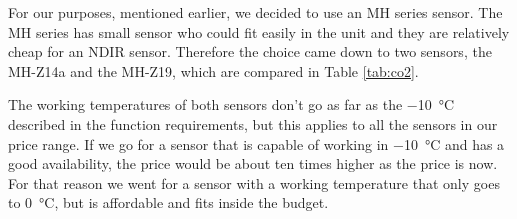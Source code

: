\documentclass[a4paper,oneside]{book}
\begin{document}
For our purposes, mentioned earlier,  we decided to use an MH series 
sensor. The MH series has small sensor who could fit easily in the unit and
they are relatively cheap for an NDIR  sensor. Therefore the choice
came down to two sensors, the MH-Z14a and the MH-Z19, which are compared in
Table \ref{tab:co2}.

\begin{table}[!htb]
\centering
{}
\caption{Comparison of  sensors \protect\cite{mh-z14a} \protect\cite{mh-z19}}
\label{tab:co2}
\end{table}

The working temperatures of both sensors don't go as far as the
\SI{-10}{\celsius} described
in the function requirements, but this applies to all the sensors in our price
range. If we go for a  sensor that is capable of working in
\SI{-10}{\celsius} and has a
good availability, the price would be about ten times higher as the price is
now. For that reason we went for a sensor with a working temperature that only
goes to \SI{0}{\celsius}, but is affordable and fits inside the budget.
\end{document}
